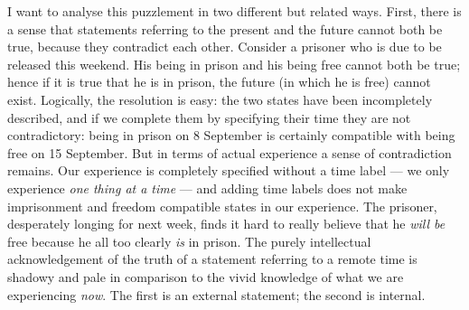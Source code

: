 \documentclass[12pt,a4paper,reqno]{article}
\renewcommand{\(}{\left(}
\renewcommand{\)}{\right)}
\newcommand{\<}{\langle}
\renewcommand{\>}{\rangle}
\theoremstyle{plain} %
\theoremstyle{definition}
\theoremstyle{remark}
\begin{document}
I want to analyse this puzzlement in two different but related ways.
First, there is a sense that statements referring to the present and the
future cannot both be true, because they contradict each other. Consider
a prisoner who is due to be released this weekend. His being in prison
and his being free cannot both be true; hence if it is true that he is
in prison, the future (in which he is free) cannot exist. Logically, the
resolution is easy: the two states have been incompletely described, and
if we complete them by specifying their time they are not contradictory:
being in prison on 8 September is certainly compatible with being free
on 15 September. But in terms of actual experience a sense of
contradiction remains. Our experience is completely specified without a
time label --- we only experience \emph{one thing at a time} --- and
adding time labels does not make imprisonment and freedom compatible
states in our experience. The prisoner, desperately longing for next
week, finds it hard to really believe that he \emph{will be} free
because he all too clearly \emph{is} in prison. The purely intellectual
acknowledgement of the truth of a statement referring to a remote time
is shadowy and pale in comparison to the vivid knowledge of what we are
experiencing \emph{now}. The first is an external statement; the second
is internal.
\end{document}
